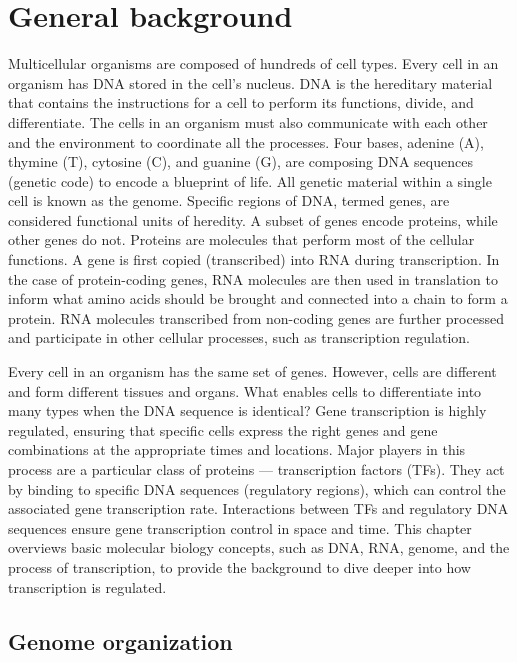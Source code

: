\chapter{General background}

Multicellular organisms are composed of hundreds of cell types. Every cell in an organism has \ac{DNA} stored in the cell's nucleus. DNA is the hereditary material that contains the instructions for a cell to perform its functions, divide, and differentiate. The cells in an organism must also communicate with each other and the environment to coordinate all the processes. Four bases, adenine (A), thymine (T), cytosine (C), and guanine (G), are composing DNA sequences (genetic code) to encode a blueprint of life. All genetic material within a single cell is known as the genome. Specific regions of DNA, termed genes, are considered functional units of heredity. A subset of genes encode proteins, while other genes do not. Proteins are molecules that perform most of the cellular functions. A gene is first copied (transcribed) into \ac{RNA} during transcription. In the case of protein-coding genes, RNA molecules are then used in translation to inform what amino acids should be brought and connected into a chain to form a protein. RNA molecules transcribed from non-coding genes are further processed and participate in other cellular processes, such as transcription regulation.

Every cell in an organism has the same set of genes. However, cells are different and form different tissues and organs. What enables cells to differentiate into many types when the DNA sequence is identical? Gene transcription is highly regulated, ensuring that specific cells express the right genes and gene combinations at the appropriate times and locations. Major players in this process are a particular class of proteins --- transcription factors (TFs). They act by binding to specific DNA sequences (regulatory regions), which can control the associated gene transcription rate. Interactions between TFs and regulatory DNA sequences ensure gene transcription control in space and time. This chapter overviews basic molecular biology concepts, such as DNA, RNA, genome, and the process of transcription, to provide the background to dive deeper into how transcription is regulated.

\section{Genome organization}

